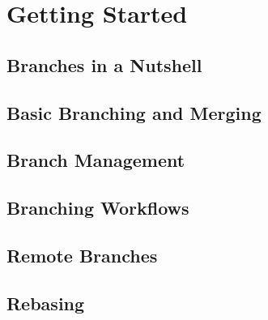 \section{Getting Started}


\subsection{Branches in a Nutshell}
\begin{frame}[t]{}
\end{frame}

\subsection{Basic Branching and Merging}
\begin{frame}[t]{}
\end{frame}

\subsection{Branch Management}
\begin{frame}[t]{}
\end{frame}

\subsection{Branching Workflows}
\begin{frame}[t]{}
\end{frame}

\subsection{Remote Branches}
\begin{frame}[t]{}
\end{frame}

\subsection{Rebasing}
\begin{frame}[t]{}
\end{frame}

\begin{frame}[t]{}
\end{frame}


